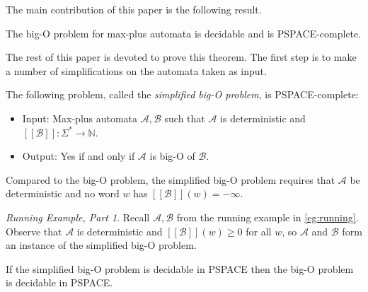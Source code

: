 \documentclass{lmcs}
\theoremstyle{remark}
\newcommand{\N}{\mathbb{N}}
\newcommand{\autA}{\mathcal{A}}
\newcommand{\autB}{\mathcal{B}}
\newcommand{\brfunc}[1]{[\![#1]\!]}
\newcommand{\funcB}{\brfunc{\autB}}
\theoremstyle{remark}
\newtheorem{runningexample/}{Running Example, Part}
\newenvironment{runningexample}
  {\renewcommand{\qedsymbol}{\color{darkgray}\ensuremath{\lrcorner}}%
   \pushQED{\qed}\begin{runningexample/}}
  {\popQED\end{runningexample/}}
\begin{document}
The main contribution of this paper is the following result.

\begin{thm}\label{thm:main}
The big-O problem for max-plus automata is decidable and is PSPACE-complete.
\end{thm}

The rest of this paper is devoted to prove this theorem. The first step is to make a number of simplifications on the automata taken as input.

\begin{thm}\label{thm:main-simplified}
The following problem, called the \emph{simplified big-O problem}, is PSPACE-complete: 
\begin{itemize}
\item Input: Max-plus automata $\autA,\autB$ such that $\autA$ is deterministic and $\funcB:\Sigma^* \to \N$.
\item Output: Yes if and only if $\autA$ is big-O of $\autB$.
\end{itemize}
\end{thm}
Compared to the big-O problem, the simplified big-O problem requires that $\autA$ be deterministic and no word $w$ has $\funcB(w) = -\infty$. 

\begin{runningexample}
Recall $\autA,\autB$ from the running example in \cref{eg:running}. Observe that $\autA$ is deterministic and $\funcB(w) \ge 0$ for all $w$, so $\autA$ and $\autB$ form an instance of the simplified big-O problem.
\end{runningexample}

\begin{prop}\label{prop:tosimplified}
If the simplified big-O problem is decidable in PSPACE then the big-O problem is decidable in PSPACE.
\end{prop}
\end{document}
